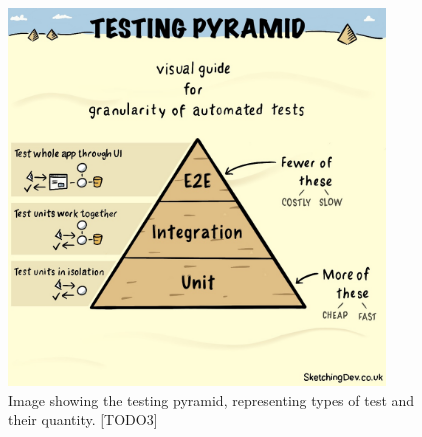  \begin{figure}[H]
    \centering
    \includegraphics[width=10cm]{assets/testingPyramid.jpg}
    \caption{Image showing the testing pyramid, representing types of test and their quantity. [TODO3]}
    \label{fig:testingPyramid}
  \end{figure}

